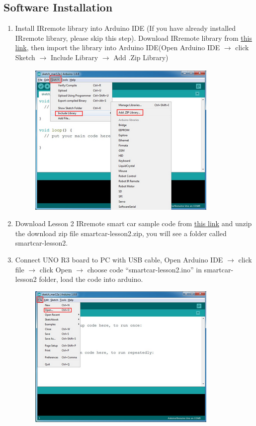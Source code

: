 \documentclass{article}
\begin{document}
\subsection{Software Installation}
\begin{enumerate}
	\item Install IRremote library into Arduino IDE (If you have already installed IRremote library, please skip this step). Download IRremote library from \href{https://osoyoo.com/wp-content/uploads/samplecode/IRremote.zip}{this link}, then import the library into Arduino IDE(Open Arduino IDE $\rightarrow$ click Sketch $\rightarrow$ Include Library $\rightarrow$ Add .Zip Library)
	
	\begin{figure}[H]
		\centering
		\includegraphics[width=0.7\linewidth]{Images/eSoftware1}
		\label{fig:esoftware1}
	\end{figure}
	
	
	\item Download Lesson 2 IRremote smart car sample code from \href{https://osoyoo.com/driver/v2smartcar-lesson2.zip}{this link} and unzip the download zip file smartcar-lesson2.zip, you will see a folder called smartcar-lesson2.
	
	\item Connect UNO R3 board to PC with USB cable, Open Arduino IDE $\rightarrow$ click file $\rightarrow$ click Open $\rightarrow$ choose code “smartcar-lesson2.ino” in smartcar-lesson2 folder, load the code into arduino.
	
	\begin{figure}[H]
		\centering
		\includegraphics[width=0.7\linewidth]{Images/eSoftware3}
		\caption{}
		\label{fig:esoftware3}
	\end{figure}
	

\end{enumerate}
\end{document}
